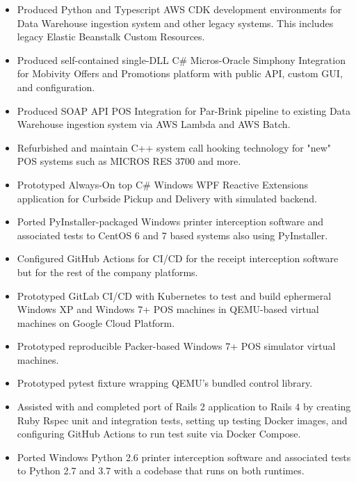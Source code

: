 \documentclass[10pt,letter,ragged2e]{altacv}
\begin{document}
\begin{paracol}{2}


\begin{itemize}
\item Produced Python and Typescript AWS CDK development environments for Data Warehouse ingestion system and other legacy systems. This includes legacy Elastic Beanstalk Custom Resources.
\item Produced self-contained single-DLL C\# Micros-Oracle Simphony Integration for Mobivity Offers and Promotions platform with public API, custom GUI, and configuration.
\item Produced SOAP API POS Integration for Par-Brink pipeline to existing Data Warehouse ingestion system via AWS Lambda and AWS Batch.
\item Refurbished and maintain C++ system call hooking technology for "new" POS systems such as MICROS RES 3700 and more.
\item Prototyped Always-On top C\# Windows WPF Reactive Extensions application for Curbside Pickup and Delivery with simulated backend.
\item Ported PyInstaller-packaged Windows printer interception software and associated tests to CentOS 6 and 7 based systems also using PyInstaller.
\item Configured GitHub Actions for CI/CD for the receipt interception software but for the rest of the company platforms.
\item Prototyped GitLab CI/CD with Kubernetes to test and build ephermeral Windows XP and Windows 7+ POS machines in QEMU-based virtual machines on Google Cloud Platform. 
\item Prototyped reproducible Packer-based Windows 7+ POS simulator virtual machines.
\item Prototyped pytest fixture wrapping QEMU's bundled control library. 
\item Assisted with and completed port of Rails 2 application to Rails 4 by creating Ruby Rspec unit and integration tests, setting up testing Docker images, and configuring GitHub Actions to run test suite via Docker Compose.
\item Ported Windows Python 2.6 printer interception software and associated tests to Python 2.7 and 3.7 with a codebase that runs on both runtimes.

\end{itemize}
\end{paracol}
\end{document}
